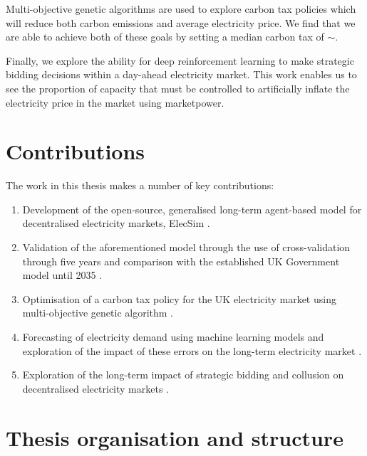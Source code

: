 Multi-objective genetic algorithms are used to explore carbon tax policies which will reduce both carbon emissions and average electricity price. We find that we are able to achieve both of these goals by setting a median carbon tax of ${\sim}$.

Finally, we explore the ability for deep reinforcement learning to make strategic bidding decisions within a day-ahead electricity market. This work enables us to see the proportion of capacity that must be controlled to artificially inflate the electricity price in the market using \gls{marketpower}. 

\section{Contributions}

The work in this thesis makes a number of key contributions:

\begin{enumerate}
	\item Development of the open-source, generalised long-term agent-based model for decentralised electricity markets, ElecSim \cite{Kell}.
	\item Validation of the aforementioned model through the use of cross-validation through five years and comparison with the established UK Government model until 2035 \cite{Kell2020}.
	\item Optimisation of a carbon tax policy for the UK electricity market using multi-objective genetic algorithm \cite{Kell2020a}.
	\item Forecasting of electricity demand using machine learning models and exploration of the impact of these errors on the long-term electricity market \cite{Kell2018a}.
	\item Exploration of the long-term impact of strategic bidding and collusion on decentralised electricity markets \cite{Kell2020d}.
\end{enumerate}

\section{Thesis organisation and structure}


